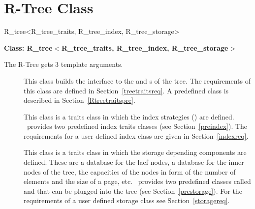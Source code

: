 \section{R-Tree Class}
\label{r-tree}
\begin{ccClassTemplate}{R_tree<R_tree_traits, R_tree_index, R_tree_storage>}

\noindent
{\bf Class: R\_tree$<$R\_tree\_traits, R\_tree\_index, R\_tree\_storage$>$}

\ccDefinition
The R-Tree gets 3 template arguments.
\begin{description}
\item[] This class builds the interface to the 
   and s of the tree. The requirements of this 
  class are defined in Section~\ref{treetraitsreq}. A predefined
   class is described in
  Section~\ref{Rtreetraitspre}.
\item[] This class is a traits class in which
  the index strategies () are
  defined. \cgal\ provides two predefined index traits classes
  (see Section~\ref{preindex}). The requirements for a user defined 
  index class are given in Section~\ref{indexreq}.
\item[] This class is a traits class in which 
  the storage depending components are defined.  These are 
a database for the laef nodes, a database for the inner nodes of
the tree, the capacities of the nodes in form of the number of
elements and the size of a page, etc. \cgal\ provides two
predefined  classes called
 and 
that can be plugged into the tree (see
Section~\ref{prestorage}). For the requirements of a user defined 
storage class see Section~\ref{storagereq}.

\end{description}
\end{ccClassTemplate}
